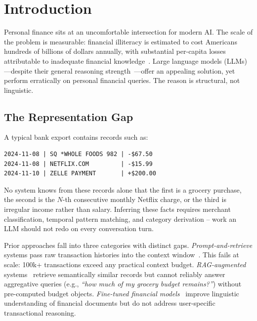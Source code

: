 \documentclass[conference]{IEEEtran}
\begin{document}
\section{Introduction}

Personal finance sits at an uncomfortable intersection for modern
AI. The scale of the problem is measurable: financial illiteracy is
estimated to cost Americans hundreds of billions of dollars
annually, with substantial per-capita losses attributable to
inadequate financial knowledge~\cite{nfec_literacy}. Large language
models (LLMs)---despite their general reasoning
strength~\cite{zhao_llm_survey}---offer an appealing solution, yet
perform erratically on personal financial queries. The reason is
structural, not linguistic.

\subsection{The Representation Gap}

A typical bank export contains records such as:

\begin{verbatim}
2024-11-08 | SQ *WHOLE FOODS 982 | -$67.50
2024-11-08 | NETFLIX.COM         | -$15.99
2024-11-10 | ZELLE PAYMENT       | +$200.00
\end{verbatim}

No system knows from these records alone that the first is a
grocery purchase, the second is the $N$-th consecutive monthly
Netflix charge, or the third is irregular income rather than
salary. Inferring these facts requires merchant classification,
temporal pattern matching, and category derivation -- work an LLM
should not redo on every conversation turn.

Prior approaches fall into three categories with distinct gaps.
\emph{Prompt-and-retrieve} systems pass raw transaction histories
into the context window~\cite{li_finance_llm_survey}. This fails at
scale: 100k+ transactions exceed any practical context budget.
\emph{RAG-augmented} systems~\cite{graphrag} retrieve semantically
similar records but cannot reliably answer aggregative queries
(e.g., \emph{``how much of my grocery budget remains?''}) without
pre-computed budget objects. \emph{Fine-tuned financial
models}~\cite{bloomberggpt,finbert,fingpt,open_finllms,fin_r1}
improve linguistic understanding of financial documents but do not
address user-specific transactional reasoning.
\end{document}
